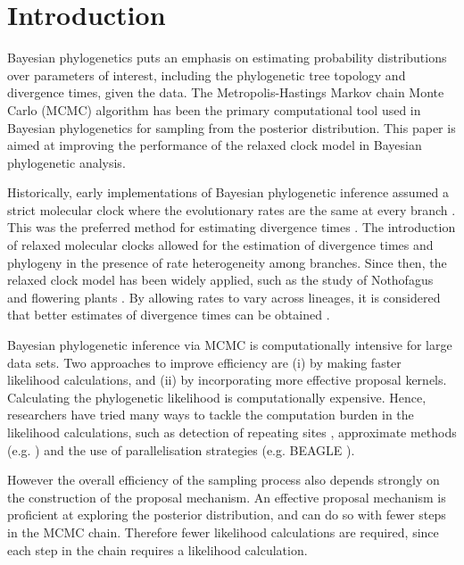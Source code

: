 \documentclass{bmcart}
\begin{document}

\section*{Introduction}
Bayesian phylogenetics puts an emphasis on estimating probability distributions over parameters of interest, including the phylogenetic tree topology and divergence times, given the data. The Metropolis-Hastings Markov chain Monte Carlo (MCMC) \cite{metropolis1953equation,hastings1970monte} algorithm has been the primary computational tool used in Bayesian phylogenetics for sampling from the posterior distribution. This paper is aimed at improving the performance of the relaxed clock model in Bayesian phylogenetic analysis. 

Historically, early implementations of Bayesian phylogenetic inference \cite{yang1997bayesian} assumed a strict molecular clock where the evolutionary rates are the same at every branch \cite{zuckerkandl1965evolutionary}. This was the preferred method for estimating divergence times \cite{yang1997bayesian,rannala2003bayes}. The introduction of relaxed molecular clocks allowed for the estimation of divergence times \cite{thorne1998estimating} and phylogeny \cite{drummond2006relaxed} in the presence of rate heterogeneity among branches. Since then, the relaxed clock model has been widely applied, such as the study of Nothofagus \cite{knapp2005relaxed} and flowering plants \cite{smith2010uncorrelated}. By allowing rates to vary across lineages, it is considered that better estimates of divergence times can be obtained \cite{ho2005accuracy,renner2005relaxed,lepage2007general}. 

Bayesian phylogenetic inference via MCMC is computationally intensive for large data sets. 
Two approaches to improve efficiency are (i) by making faster likelihood calculations, and (ii) by incorporating more effective proposal kernels. Calculating the phylogenetic likelihood is computationally expensive. 
Hence, researchers have tried many ways to tackle the computation burden in the likelihood calculations, such as detection of repeating sites \cite{kobert2017efficient},  approximate methods (e.g. \cite{reis2011approximate}) and the use of parallelisation strategies (e.g. BEAGLE \cite{ayres2011beagle}). 

However the overall efficiency of the sampling process also depends strongly on the construction of the proposal mechanism. An effective proposal mechanism is proficient at exploring the posterior distribution, and can do so with fewer steps in the MCMC chain. Therefore fewer likelihood calculations are required, since each step in the chain requires a likelihood calculation.
\end{document}
